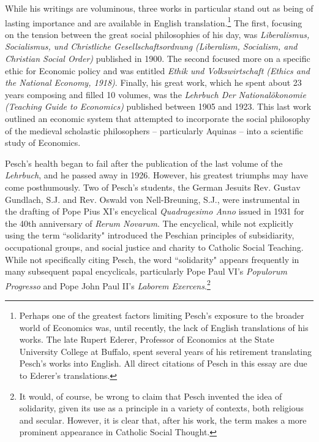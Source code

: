 \documentclass{article}
\begin{document}
While his writings are voluminous, three works in particular stand out as being of lasting importance and are available in English translation.\footnote{Perhaps one of the greatest factors limiting Pesch’s exposure to the broader world of Economics was, until recently, the lack of English translations of his works.  The late Rupert Ederer, Professor of Economics at the State University College at Buffalo, spent several years of his retirement translating Pesch’s works into English.  All direct citations of Pesch in this essay are due to Ederer’s translations.}  The first, focusing on the tension between the great social philosophies of his day, was \emph{Liberalismus, Socialismus, und Christliche Gesellschaftsordnung (Liberalism, Socialism, and Christian Social Order)} published in 1900.  The second focused more on a specific ethic for Economic policy and was entitled \emph{Ethik und Volkswirtschaft (Ethics and the National Economy, 1918)}.  Finally, his great work, which he spent about 23 years composing and filled 10 volumes, was the \emph{Lehrbuch Der National\"{o}konomie (Teaching Guide to Economics)} published between 1905 and 1923.  This last work outlined an economic system that attempted to incorporate the social philosophy of the medieval scholastic philosophers – particularly Aquinas – into a scientific study of Economics.\medskip

Pesch’s health began to fail after the publication of the last volume of the \emph{Lehrbuch}, and he passed away in 1926.  However, his greatest triumphs may have come posthumously.  Two of Pesch’s students, the German Jesuits Rev. Gustav Gundlach, S.J. and Rev. Oswald von Nell-Breuning, S.J., were instrumental in the drafting of Pope Pius XI’s encyclical \emph{Quadragesimo Anno} issued in 1931 for the 40th anniversary of \emph{Rerum Novarum}.  The encyclical, while not explicitly using the term ``solidarity" introduced the Peschian principles of subsidiarity, occupational groups, and social justice and charity to Catholic Social Teaching. \citep{ederer1991}  While not specifically citing Pesch, the word ``solidarity" appears frequently in many subsequent papal encyclicals, particularly Pope Paul VI’s \emph{Populorum Progresso} and Pope John Paul II’s \emph{Laborem Exercens}.\footnote{It would, of course, be wrong to claim that Pesch invented the idea of solidarity, given its use as a principle in a variety of contexts, both religious and secular.  However, it is clear that, after his work, the term makes a more prominent appearance in Catholic Social Thought.}
\end{document}
